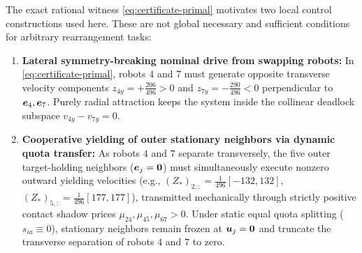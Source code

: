 \begin{remark}\label{rem:two-conditions}
The exact rational witness \eqref{eq:certificate-primal} motivates two local control constructions used here. These are not global necessary and sufficient conditions for arbitrary rearrangement tasks:
\begin{enumerate}
 \item \textbf{Lateral symmetry-breaking nominal drive from swapping robots:} In \eqref{eq:certificate-primal}, robots $4$ and $7$ must generate opposite transverse velocity components $z_{4y}=+\frac{206}{496}>0$ and $z_{7y}=-\frac{290}{496}<0$ perpendicular to $\boldsymbol{e}_4,\boldsymbol{e}_7$. Purely radial attraction keeps the system inside the collinear deadlock subspace $v_{4y}-v_{7y}=0$.
 \item \textbf{Cooperative yielding of outer stationary neighbors via dynamic quota transfer:} As robots $4$ and $7$ separate transversely, the five outer target-holding neighbors ($\boldsymbol{e}_j=\boldsymbol 0$) must simultaneously execute nonzero outward yielding velocities (e.g., $(Z_*)_{2,:}=\frac1{496}[-132,132]$, $(Z_*)_{5,:}=\frac1{496}[177,177]$), transmitted mechanically through strictly positive contact shadow prices $\mu_{24},\mu_{45},\mu_{67}>0$. Under static equal quota splitting ($s_{ia}\equiv 0$), stationary neighbors remain frozen at $\boldsymbol{u}_j=\boldsymbol 0$ and truncate the transverse separation of robots $4$ and $7$ to zero.
\end{enumerate}
\end{remark}
